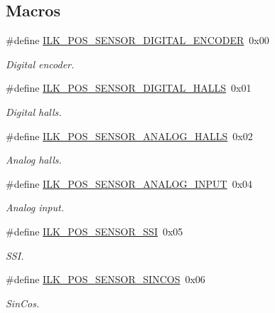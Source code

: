 \subsection*{Macros}
\begin{DoxyCompactItemize}
\item 
\#define \hyperlink{group__IL__CONST__POS__SENSOR_ga9e22496d29b1c97487de0d32559d2492}{I\+L\+K\+\_\+\+P\+O\+S\+\_\+\+S\+E\+N\+S\+O\+R\+\_\+\+D\+I\+G\+I\+T\+A\+L\+\_\+\+E\+N\+C\+O\+D\+ER}~0x00
\begin{DoxyCompactList}\small\item\em Digital encoder. \end{DoxyCompactList}\item 
\#define \hyperlink{group__IL__CONST__POS__SENSOR_gadf3325d38c0443100a7250e690f59616}{I\+L\+K\+\_\+\+P\+O\+S\+\_\+\+S\+E\+N\+S\+O\+R\+\_\+\+D\+I\+G\+I\+T\+A\+L\+\_\+\+H\+A\+L\+LS}~0x01
\begin{DoxyCompactList}\small\item\em Digital halls. \end{DoxyCompactList}\item 
\#define \hyperlink{group__IL__CONST__POS__SENSOR_gad4226b47b6b8d3876a153a99d6ac6b22}{I\+L\+K\+\_\+\+P\+O\+S\+\_\+\+S\+E\+N\+S\+O\+R\+\_\+\+A\+N\+A\+L\+O\+G\+\_\+\+H\+A\+L\+LS}~0x02
\begin{DoxyCompactList}\small\item\em Analog halls. \end{DoxyCompactList}\item 
\#define \hyperlink{group__IL__CONST__POS__SENSOR_ga9ad3cda1577a3d1a912a7b9fdff366d9}{I\+L\+K\+\_\+\+P\+O\+S\+\_\+\+S\+E\+N\+S\+O\+R\+\_\+\+A\+N\+A\+L\+O\+G\+\_\+\+I\+N\+P\+UT}~0x04
\begin{DoxyCompactList}\small\item\em Analog input. \end{DoxyCompactList}\item 
\#define \hyperlink{group__IL__CONST__POS__SENSOR_gac3a8ad54033792117e711e4282ff0702}{I\+L\+K\+\_\+\+P\+O\+S\+\_\+\+S\+E\+N\+S\+O\+R\+\_\+\+S\+SI}~0x05
\begin{DoxyCompactList}\small\item\em S\+SI. \end{DoxyCompactList}\item 
\#define \hyperlink{group__IL__CONST__POS__SENSOR_ga83adaa5a63bbae0da0a15e6700181558}{I\+L\+K\+\_\+\+P\+O\+S\+\_\+\+S\+E\+N\+S\+O\+R\+\_\+\+S\+I\+N\+C\+OS}~0x06
\begin{DoxyCompactList}\small\item\em Sin\+Cos. \end{DoxyCompactList}\item 

\end{DoxyCompactItemize}
